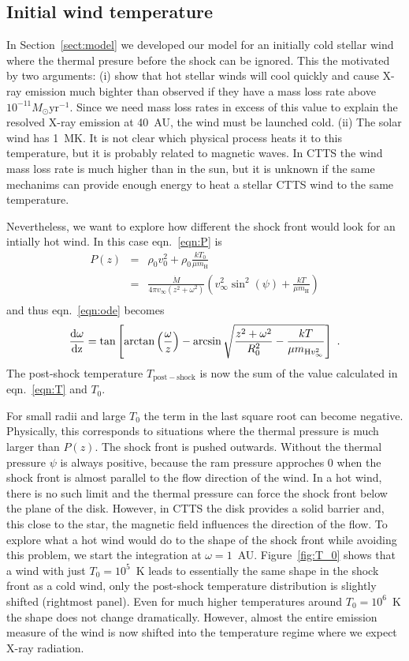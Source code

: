 \subsection{Initial wind temperature}
\label{sect:T_0}
In Section~\ref{sect:model} we developed our model for an initially cold stellar wind where the thermal presure before the shock can be ignored. This the motivated by two arguments: (i) \citet{2007IAUS..243..299M} show that hot stellar winds will cool quickly and cause X-ray emission much bighter than observed if they have a mass loss rate above $10^{-11}M_\odot\mathrm{ yr}^{-1}$. Since we need mass loss rates in excess of this value to explain the resolved X-ray emission at 40~AU, the wind must be launched cold. (ii) The solar wind has 1~MK. It is not clear which physical process heats it to this temperature, but it is probably related to magnetic waves. In CTTS the wind mass loss rate is much higher than in the sun, but it is unknown if the same mechanims can provide enough energy to heat a stellar CTTS wind to the same temperature.

Nevertheless, we want to explore how different the shock front would look for an intially hot wind.
In this case eqn.~\ref{eqn:P} is
\begin{eqnarray}
P(z) & = & \rho_0 v_0^2 + \rho_0 \frac{k T_0}{\mu m_{\textrm{H}}} \nonumber\\ 
     & = & \frac{\dot{M}}{4\pi v_{\infty}(z^2+\omega^2)} \left( v_{\infty}^2 \sin^2(\psi) + \frac{kT}{\mu m_{\textrm{H}}}\right)\\
\end{eqnarray}
and thus eqn.~\ref{eqn:ode} becomes
\begin{equation}
\frac{\rm{d}\omega}{\rm{d}z} = \tan\left[\arctan\left(\frac{\omega}{z}\right)-\arcsin\sqrt{\frac{z^2+\omega^2}{R_0^2}-\frac{kT}{\mu m_{\textrm{H} v_{\infty}^2}}}\right]\ .
\end{equation}
The post-shock temperature $T_{\mathrm{post-shock}}$ is now the sum of the value calculated in eqn.~\ref{eqn:T} and $T_0$.

For small radii and large $T_0$ the term in the last square root can become negative. Physically, this corresponds to situations where the thermal pressure is much larger than $P(z)$. The shock front is pushed outwards. Without the thermal pressure $\psi$ is always positive, because the ram pressure approches 0 when the shock front is almost parallel to the flow direction of the wind. In a hot wind, there is no such limit and the thermal pressure can force the shock front below the plane of the disk. However, in CTTS the disk provides a solid barrier and, this close to the star, the magnetic field influences the direction of the flow. To explore what a hot wind would do to the shape of the shock front while avoiding this problem, we start the integration at $\omega=1$~AU. Figure~\ref{fig:T_0} shows that a wind with just $T_0=10^5$~K leads to essentially the same shape in the shock front as a cold wind, only the post-shock temperature distribution is slightly shifted (rightmost panel). Even for much higher temperatures around $T_0=10^6$~K the shape does not change dramatically. However, almost the entire emission measure of the wind is now shifted into the temperature regime where we expect X-ray radiation.
